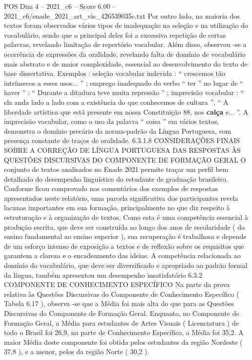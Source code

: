\begin{textsample}{POS Dim 4 – 2021\_c6 – Score 6.00 – 2021\_c6/enade\_2021\_art\_vis\_426539035c.txt}
Por outro lado, na maioria dos textos foram observados vários tipos de inadequação na seleção e na utilização do vocabulário, sendo que o principal deles foi a excessiva repetição de certas palavras, revelando limitação de repertório vocabular.
Além disso, observou -se a ocorrência de expressões da oralidade, revelando falta de domínio de vocabulário mais abstrato e de maior complexidade, essencial ao desenvolvimento do texto de base dissertativa.
Exemplos : seleção vocabular indevida : “ crescemos tão intrínsecos a esses usos... ” ; emprego inadequado do verbo “ ter ” no lugar de “ haver ” : “ Durante a ditadura teve muita repressão ” ; imprecisão vocabular : “ ela anda lado a lado com a existência do que conhecemos de cultura ”, “ A liberdade artística que está presente em nossa Constituição 88, nos \textbf{calça} e... ”.
A imprecisão vocabular, como o uso da palavra “ coisa ” em vários textos, demonstra o domínio precário da norma-padrão da Língua Portuguesa, com presença constante de traços de oralidade. 6.3.1.8 CONSIDERAÇÕES FINAIS SOBRE A CORREÇÃO DE LÍNGUA PORTUGUESA DAS RESPOSTAS ÀS QUESTÕES DISCURSIVAS DO COMPONENTE DE FORMAÇÃO GERAL O conjunto de textos analisados no Enade 2021 permite traçar um perfil bem detalhado do desempenho linguístico do estudante de graduação brasileiro.
Conforme ficou comprovado nos comentários dos exemplos de respostas apresentados neste relatório, uma parcela significativa dos participantes revela lacunas importantes em sua formação, principalmente no que diz respeito à estruturação e à organização de textos.
Como esta é uma competência essencial à produção escrita, que deve ser construída ao longo dos anos de escolaridade ( do ensino fundamental ao ensino superior ), sua recuperação é trabalhosa e depende de um esforço intenso de exposição a textos e de reflexão sobre os requisitos que garantem a clareza e o encadeamento das ideias.
A competência relacionada ao domínio do vocabulário, que deve ser diversificado e apropriado ao padrão formal da língua, também apresentou um desempenho insatisfatório 6.3.2 COMPONENTE DE CONHECIMENTO ESPECÍFICO Na parte da prova relativa às Questões Discursivas do Componente de Conhecimento Específico ( Tabela 6.17 ), observa -se que a Média foi mais alta do que para as Questões Discursivas do Componente de Formação Geral.
Enquanto, no Componente de Formação Geral, a Média para estudantes de Artes Visuais ( Licenciatura ) de todo o Brasil foi 26,9, na parte de Conhecimento Específico, a Média foi 35,2.
A maior Média deste componente foi obtida pelos estudantes da região Nordeste ( 37,8 ), e a menor, pelos da região Norte ( 30,2 ).

\end{textsample}
